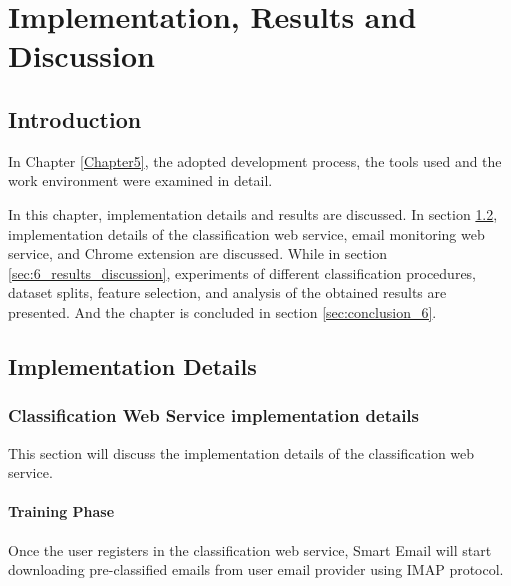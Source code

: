 
\chapter{Implementation, Results and Discussion} %

\label{Chapter6} %



\section{Introduction}
In Chapter \ref{Chapter5}, the adopted development process, the tools used and the work environment were examined in detail.

In this chapter, implementation details and results are discussed. In section
\ref{sec:6_imp_details}, implementation details of the classification web service,
email monitoring web service, and Chrome extension are discussed. While in section
\ref{sec:6_results_discussion}, experiments of different classification procedures,
dataset splits, feature selection, and analysis of the obtained results are presented. 
And the chapter is concluded in section \ref{sec:conclusion_6}.

\section{Implementation Details}
\label{sec:6_imp_details}

\subsection{Classification Web Service implementation details}
This section will discuss the implementation details of the classification web service.


    \subsubsection{Training Phase}
    Once the user registers in the classification web service, Smart Email will start downloading pre-classified emails from
    user email provider using IMAP protocol.

